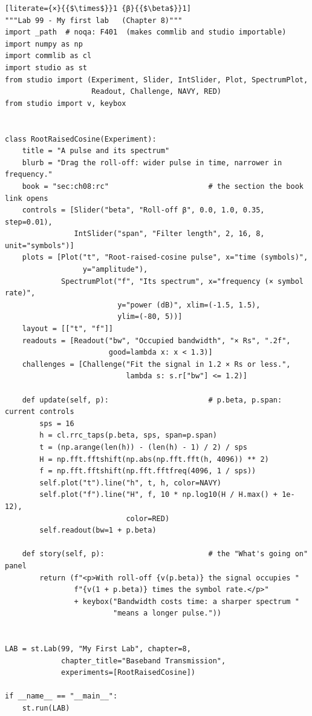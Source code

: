\begin{lstlisting}[literate={×}{{$\times$}}1 {β}{{$\beta$}}1]
"""Lab 99 - My first lab   (Chapter 8)"""
import _path  # noqa: F401  (makes commlib and studio importable)
import numpy as np
import commlib as cl
import studio as st
from studio import (Experiment, Slider, IntSlider, Plot, SpectrumPlot,
                    Readout, Challenge, NAVY, RED)
from studio import v, keybox


class RootRaisedCosine(Experiment):
    title = "A pulse and its spectrum"
    blurb = "Drag the roll-off: wider pulse in time, narrower in frequency."
    book = "sec:ch08:rc"                       # the section the book link opens
    controls = [Slider("beta", "Roll-off β", 0.0, 1.0, 0.35, step=0.01),
                IntSlider("span", "Filter length", 2, 16, 8, unit="symbols")]
    plots = [Plot("t", "Root-raised-cosine pulse", x="time (symbols)",
                  y="amplitude"),
             SpectrumPlot("f", "Its spectrum", x="frequency (× symbol rate)",
                          y="power (dB)", xlim=(-1.5, 1.5),
                          ylim=(-80, 5))]
    layout = [["t", "f"]]
    readouts = [Readout("bw", "Occupied bandwidth", "× Rs", ".2f",
                        good=lambda x: x < 1.3)]
    challenges = [Challenge("Fit the signal in 1.2 × Rs or less.",
                            lambda s: s.r["bw"] <= 1.2)]

    def update(self, p):                       # p.beta, p.span: current controls
        sps = 16
        h = cl.rrc_taps(p.beta, sps, span=p.span)
        t = (np.arange(len(h)) - (len(h) - 1) / 2) / sps
        H = np.fft.fftshift(np.abs(np.fft.fft(h, 4096)) ** 2)
        f = np.fft.fftshift(np.fft.fftfreq(4096, 1 / sps))
        self.plot("t").line("h", t, h, color=NAVY)
        self.plot("f").line("H", f, 10 * np.log10(H / H.max() + 1e-12),
                            color=RED)
        self.readout(bw=1 + p.beta)

    def story(self, p):                        # the "What's going on" panel
        return (f"<p>With roll-off {v(p.beta)} the signal occupies "
                f"{v(1 + p.beta)} times the symbol rate.</p>"
                + keybox("Bandwidth costs time: a sharper spectrum "
                         "means a longer pulse."))


LAB = st.Lab(99, "My First Lab", chapter=8,
             chapter_title="Baseband Transmission",
             experiments=[RootRaisedCosine])

if __name__ == "__main__":
    st.run(LAB)
\end{lstlisting}

